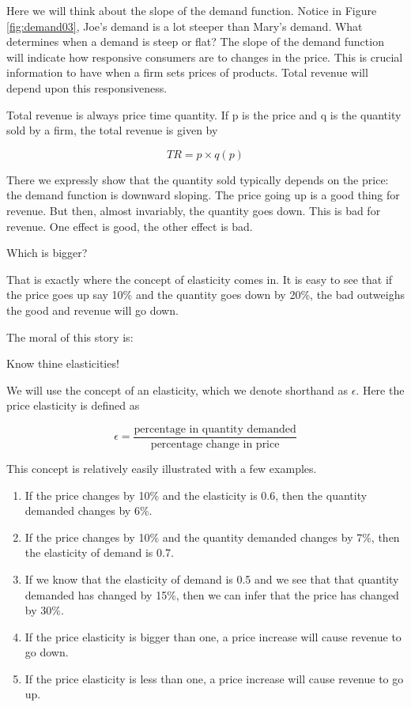 \documentclass[
]{book}
\providecommand{\tightlist}{%
  \setlength{\itemsep}{0pt}\setlength{\parskip}{0pt}}
\begin{document}
Here we will think about the slope of the demand function. Notice in Figure \ref{fig:demand03}, Joe's demand is a lot steeper than Mary's demand. What determines when a demand is steep or flat? The slope of the demand function will indicate how responsive consumers are to changes in the price. This is crucial information to have when a firm sets prices of products. Total revenue will depend upon this responsiveness.

Total revenue is always price time quantity. If p is the price and q is the quantity sold by a firm, the total revenue is given by

\[TR = p \times q(p)\]

There we expressly show that the quantity sold typically depends on the price: the demand function is downward sloping. The price going up is a good thing for revenue. But then, almost invariably, the quantity goes down. This is bad for revenue. One effect is good, the other effect is bad.

Which is bigger?

That is exactly where the concept of elasticity comes in. It is easy to see that if the price goes up say 10\% and the quantity goes down by 20\%, the bad outweighs the good and revenue will go down.

The moral of this story is:

Know thine elasticities!

We will use the concept of an elasticity, which we denote shorthand as \(\epsilon\). Here the price elasticity is defined as

\[\epsilon=\frac{\text{percentage in quantity demanded}}{\text{percentage change in price}}\]

This concept is relatively easily illustrated with a few examples.

\begin{enumerate}
\def\labelenumi{\arabic{enumi}.}
\tightlist
\item
  If the price changes by 10\% and the elasticity is 0.6, then the quantity demanded changes by 6\%.
\item
  If the price changes by 10\% and the quantity demanded changes by 7\%, then the elasticity of demand is 0.7.
\item
  If we know that the elasticity of demand is 0.5 and we see that that quantity demanded has changed by 15\%, then we can infer that the price has changed by 30\%.
\item
  If the price elasticity is bigger than one, a price increase will cause revenue to go down.
\item
  If the price elasticity is less than one, a price increase will cause revenue to go up.
\end{enumerate}
\end{document}
